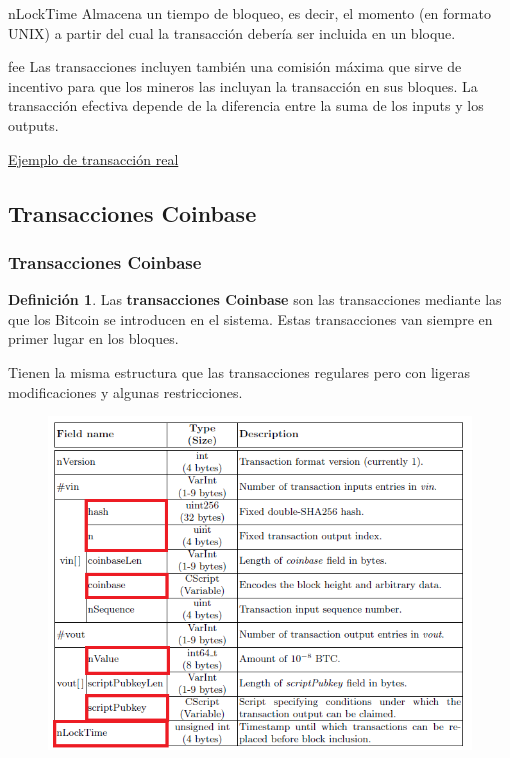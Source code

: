 \documentclass{beamer}
\theoremstyle{definition}
\newtheorem{defi}{Definición}
\begin{document}
\begin{frame}

	\begin{block}{nLockTime}
		Almacena un tiempo de bloqueo, es decir, el momento (en formato UNIX) a partir del cual la transacción debería ser incluida en un bloque.
	\end{block}\pause

\begin{block}{fee}
	Las transacciones incluyen también una comisión máxima que sirve de incentivo para que los mineros las incluyan la transacción en sus bloques. La transacción efectiva depende de la diferencia entre la suma de los inputs y los outputs.
\end{block}

\end{frame}
\begin{frame}
	\href{https://api.blockcypher.com/v1/btc/main/txs/0142f951d09eb4df18eeff1879d548974f3afd6b94443dff5b2aba4ce5d5a403?limit=50&includeHex=true}{Ejemplo de transacción real} 
	
\end{frame}
\subsection{Transacciones Coinbase}
\begin{frame}
	\frametitle{Transacciones Coinbase}
	\begin{defi}
		Las \textbf{transacciones Coinbase} son las transacciones mediante las que los Bitcoin se introducen en el sistema. Estas transacciones van siempre en primer lugar en los bloques. 
	\end{defi}\pause

Tienen la misma estructura que las transacciones regulares pero con ligeras modificaciones y algunas restricciones.
\end{frame}

\begin{frame}

	\begin{figure}
		\includegraphics[scale=0.5]{coinbase}
	\end{figure}
\end{frame}
\end{document}
